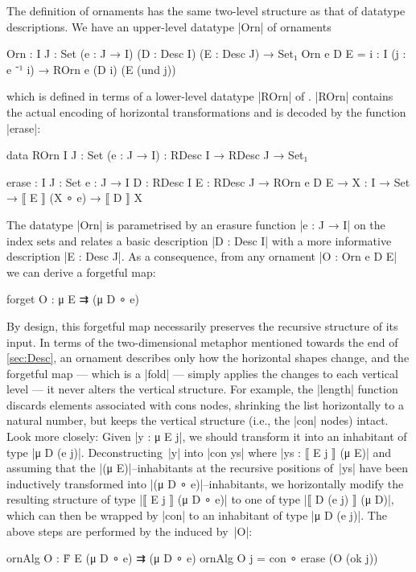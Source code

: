 The definition of ornaments has the same two-level structure as that of datatype descriptions.
We have an upper-level datatype |Orn| of ornaments
\begin{code}
Orn : {I J : Set} (e : J → I) (D : Desc I) (E : Desc J) → Set₁
Orn e D E = {i : I} (j : e ⁻¹ i) → ROrn e (D i) (E (und j))
\end{code}
which is defined in terms of a lower-level datatype |ROrn| of .
|ROrn| contains the actual encoding of horizontal transformations and is decoded by the function |erase|:
\begin{code}
data ROrn {I J : Set} (e : J → I) : RDesc I → RDesc J → Set₁
           
erase :  {I J : Set} {e : J → I} {D : RDesc I} {E : RDesc J} →
         ROrn e D E → {X : I → Set} → ⟦ E ⟧ (X ∘ e) → ⟦ D ⟧ X
\end{code}
The datatype |Orn| is parametrised by an erasure function |e : J → I| on the index sets and relates a basic description |D : Desc I| with a more informative description |E : Desc J|.
As a consequence, from any ornament |O : Orn e D E| we can derive a forgetful map:
\begin{spec}
forget O : μ E ⇉ (μ D ∘ e)
\end{spec}
By design, this forgetful map necessarily preserves the recursive structure of its input.
In terms of the two-dimensional metaphor mentioned towards the end of \autoref{sec:Desc}, an ornament describes only how the horizontal shapes change, and the forgetful map --- which is a |fold| --- simply applies the changes to each vertical level --- it never alters the vertical structure.
For example, the |length| function discards elements associated with cons nodes, shrinking the list horizontally to a natural number, but keeps the vertical structure (i.e., the |con| nodes) intact.
Look more closely:
Given |y : μ E j|, we should transform it into an inhabitant of type |μ D (e j)|.
Deconstructing~|y| into |con ys| where |ys : ⟦ E j ⟧ (μ E)| and assuming that the |(μ E)|--inhabitants at the recursive positions of~|ys| have been inductively transformed into |(μ D ∘ e)|--inhabitants, we horizontally modify the resulting structure of type |⟦ E j ⟧ (μ D ∘ e)| to one of type |⟦ D (e j) ⟧ (μ D)|, which can then be wrapped by |con| to an inhabitant of type |μ D (e j)|.
The above steps are performed by the  induced by~|O|:
\begin{code}
ornAlg O : Ḟ E (μ D ∘ e) ⇉ (μ D ∘ e)
ornAlg O {j} = con ∘ erase (O (ok j))
\end{code}
